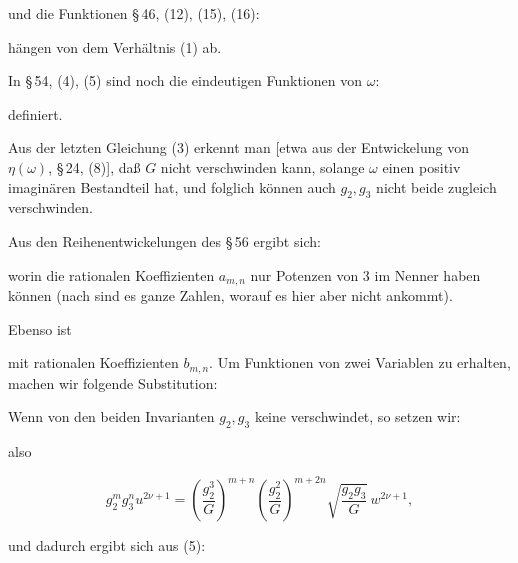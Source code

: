 
und die Funktionen \S\,46, (12), (15), (16):


h\"angen von dem Verh\"altnis (1) ab.

In \S\,54, (4), (5) sind noch die eindeutigen Funktionen von $\omega$:


definiert.

Aus der letzten Gleichung (3) erkennt man [etwa aus der Entwickelung
von $\eta(\omega)$, \S\,24, (8)], da\ss{} $G$ nicht verschwinden kann,
solange $\omega$ einen positiv imagin\"aren Bestandteil hat, und
folglich k\"onnen auch $g_2, g_3$ nicht beide zugleich verschwinden.

Aus den Reihenentwickelungen des \S\,56 ergibt sich:


worin die rationalen Koeffizienten $a_{m,n}$ nur Potenzen von 3 im
Nenner haben k\"onnen (nach  sind es ganze Zahlen,
worauf es hier aber nicht ankommt).

Ebenso ist


mit rationalen Koeffizienten $b_{m,n}$. Um Funktionen von zwei
Variablen zu erhalten, machen wir folgende Substitution:

Wenn von den beiden Invarianten $g_2, g_3$ keine verschwindet, so
setzen wir:


also

\[
g_2^m g_3^n u^{2\nu+1} = \left(\frac{g_2^3}{G}\right)^{m+n} \left(\frac{g_2^2}{G}\right)^{m+2n} \sqrt{\frac{g_2 g_3}{G}}\, w^{2\nu+1},
\]

und dadurch ergibt sich aus (5):

